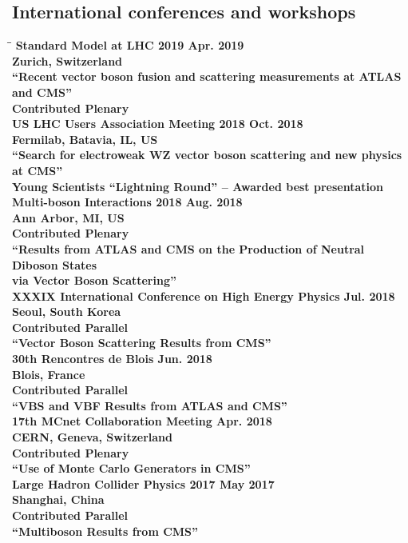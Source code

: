\documentclass[10pt]{res} %
\begin{document}
\begin{resume}
\subsection{International conferences and workshops}
\vspace{-0.1in}
\begin{tabbing}
\hspace{2.3in}\= \hspace{2.6in}\= \kill %
\bf{Standard Model at LHC 2019} 		 \> \>	    Apr. 2019 \\
Zurich, Switzerland \\
``Recent vector boson fusion and scattering measurements at ATLAS and CMS'' \\
Contributed Plenary \\ 
\bf{US LHC Users Association Meeting 2018} 		 \> \>	    Oct. 2018 \\
Fermilab, Batavia, IL, US \\
``Search for electroweak WZ vector boson scattering and new physics at CMS'' \\
Young Scientists ``Lightning Round'' -- Awarded best presentation \\ 
\bf{Multi-boson Interactions 2018} 		 \> \>	    Aug. 2018 \\
Ann Arbor, MI, US \\
Contributed Plenary \\ 
``Results from ATLAS and CMS on the Production of Neutral Diboson States \\via Vector Boson Scattering'' \\
\bf{XXXIX International Conference on High Energy Physics} 		 \> \>	    Jul. 2018 \\
Seoul, South Korea\\
Contributed Parallel\\ 
``Vector Boson Scattering Results from CMS'' \\
\bf{30th Rencontres de Blois} 		 \> \>	    Jun. 2018 \\
Blois, France\\
Contributed Parallel\\ 
``VBS and VBF Results from ATLAS and CMS'' \\
\bf{17th MCnet Collaboration Meeting} 		 \> \>	    Apr. 2018 \\
CERN, Geneva, Switzerland \\
Contributed Plenary\\ 
``Use of Monte Carlo Generators in CMS'' \\
\bf{Large Hadron Collider Physics 2017} 		 \> \>	    May 2017 \\
Shanghai, China \\
Contributed Parallel \\ 
``Multiboson Results from CMS'' \\


\end{tabbing}
\end{resume}
\end{document}
